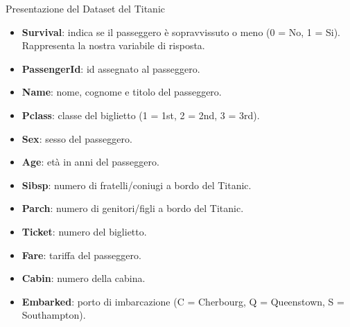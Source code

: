 \documentclass[9pt, xcolor=table]{beamer}
\begin{document}
	\begin{frame}{Presentazione del Dataset del Titanic}
		\begin{itemize}
			\item \textbf{Survival}: indica se il passeggero è sopravvissuto o meno (0 = No, 1 = Si). Rappresenta la nostra variabile di risposta.
			\item \textbf{PassengerId}: id assegnato al passeggero.
			\item \textbf{Name}: nome, cognome e titolo del passeggero.
			\item \textbf{Pclass}: classe del biglietto (1 = 1st, 2 = 2nd, 3 = 3rd).
			\item \textbf{Sex}: sesso del passeggero.
			\item \textbf{Age}: età in anni del passeggero.
			\item \textbf{Sibsp}: numero di fratelli/coniugi a bordo del Titanic.
			\item \textbf{Parch}: numero di genitori/figli a bordo del Titanic.
			\item \textbf{Ticket}: numero del biglietto.
			\item \textbf{Fare}: tariffa del passeggero.
			\item \textbf{Cabin}: numero della cabina.
			\item \textbf{Embarked}: porto di imbarcazione (C = Cherbourg, Q =
			Queenstown, S = Southampton).
		\end{itemize}
	\end{frame}
\end{document}
